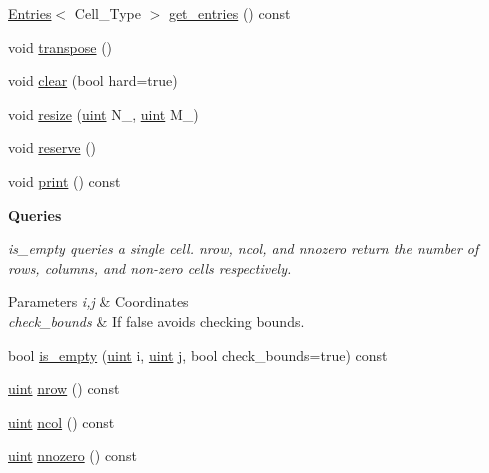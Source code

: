 \begin{DoxyCompactItemize}
\item 
\hyperlink{class_entries}{Entries}$<$ Cell\+\_\+\+Type $>$ \hyperlink{class_b_array_aee224325422d214624771a5b4d91b55e}{get\+\_\+entries} () const
\item 
void \hyperlink{class_b_array_a0284f7f2148b7c1b474ebe01f6548b98}{transpose} ()
\item 
void \hyperlink{class_b_array_a6dd5ebff333b376c6fb569e48290935f}{clear} (bool hard=true)
\item 
void \hyperlink{class_b_array_aefe411fe1890273518bfbc3f8ca616ce}{resize} (\hyperlink{typedefs_8hpp_a91ad9478d81a7aaf2593e8d9c3d06a14}{uint} N\+\_\+, \hyperlink{typedefs_8hpp_a91ad9478d81a7aaf2593e8d9c3d06a14}{uint} M\+\_\+)
\item 
void \hyperlink{class_b_array_a5eacd388e3d0f638f2c35b6e0f0c490c}{reserve} ()
\item 
void \hyperlink{class_b_array_a9d150c44b23cf1e4af45f540508db1de}{print} () const
\end{DoxyCompactItemize}
\begin{Indent}\textbf{ Queries}\par
{\em {\ttfamily is\+\_\+empty} queries a single cell. {\ttfamily nrow}, {\ttfamily ncol}, and {\ttfamily nnozero} return the number of rows, columns, and non-\/zero cells respectively. 
\begin{DoxyParams}{Parameters}
{\em i,j} & Coordinates \\
\hline
{\em check\+\_\+bounds} & If {\ttfamily false} avoids checking bounds. \\
\hline
\end{DoxyParams}
}\begin{DoxyCompactItemize}
\item 
bool \hyperlink{class_b_array_a37ed3962c0ee5030b23cb6cde23a5cdf}{is\+\_\+empty} (\hyperlink{typedefs_8hpp_a91ad9478d81a7aaf2593e8d9c3d06a14}{uint} i, \hyperlink{typedefs_8hpp_a91ad9478d81a7aaf2593e8d9c3d06a14}{uint} j, bool check\+\_\+bounds=true) const
\item 
\hyperlink{typedefs_8hpp_a91ad9478d81a7aaf2593e8d9c3d06a14}{uint} \hyperlink{class_b_array_ac829edf4a9921bd6b3f56afbcbb2f37f}{nrow} () const
\item 
\hyperlink{typedefs_8hpp_a91ad9478d81a7aaf2593e8d9c3d06a14}{uint} \hyperlink{class_b_array_ac669bd57e3cbf4c60bf2b4a459dcdc4f}{ncol} () const
\item 
\hyperlink{typedefs_8hpp_a91ad9478d81a7aaf2593e8d9c3d06a14}{uint} \hyperlink{class_b_array_a9910b6f42e37d3b0a12cafb70b78775f}{nnozero} () const
\end{DoxyCompactItemize}
\end{Indent}
